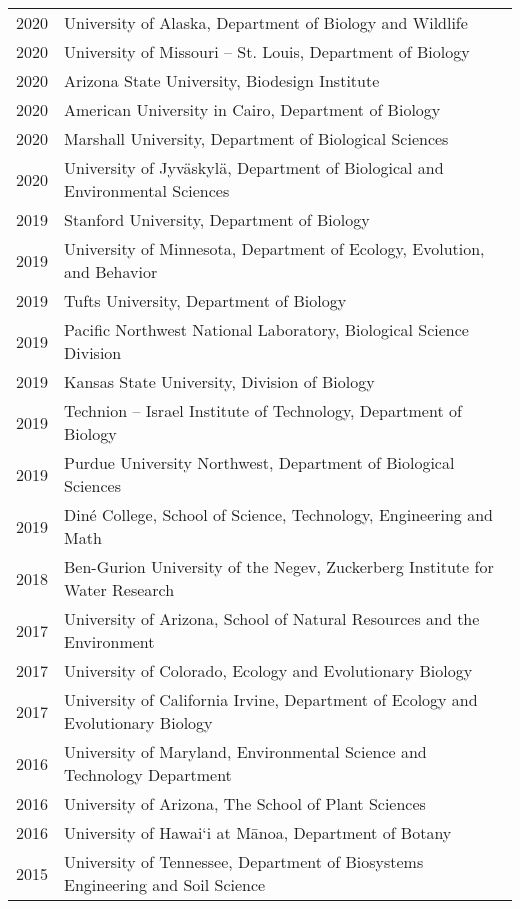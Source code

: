 \documentclass[11pt]{article}
\begin{document}
\begin{longtable}{@{}p{4em}@{\hspace{2em}}p{}@{}}
2020 & University of Alaska, Department of Biology and Wildlife \\
2020 & University of Missouri – St. Louis, Department of Biology \\
2020 & Arizona State University, Biodesign Institute \\
2020 & American University in Cairo, Department of Biology \\
2020 & Marshall University, Department of Biological Sciences \\
2020 & University of Jyväskylä, Department of Biological and Environmental Sciences \\
2019 & Stanford University, Department of Biology \\
2019 & University of Minnesota, Department of Ecology, Evolution, and Behavior \\
2019 & Tufts University, Department of Biology \\
2019 & Pacific Northwest National Laboratory, Biological Science Division \\
2019 & Kansas State University, Division of Biology \\
2019 & Technion – Israel Institute of Technology, Department of Biology \\
2019 & Purdue University Northwest, Department of Biological Sciences \\
2019 & Diné College, School of Science, Technology, Engineering and Math \\
2018 & Ben-Gurion University of the Negev, Zuckerberg Institute for Water Research \\
2017 & University of Arizona, School of Natural Resources and the Environment \\
2017 & University of Colorado, Ecology and Evolutionary Biology \\
2017 & University of California Irvine, Department of Ecology and Evolutionary Biology \\
2016 & University of Maryland, Environmental Science and Technology Department \\
2016 & University of Arizona, The School of Plant Sciences \\
2016 & University of Hawai‘i at Mānoa, Department of Botany \\
2015 & University of Tennessee, Department of Biosystems Engineering and Soil Science \\
\end{longtable}
\end{document}
